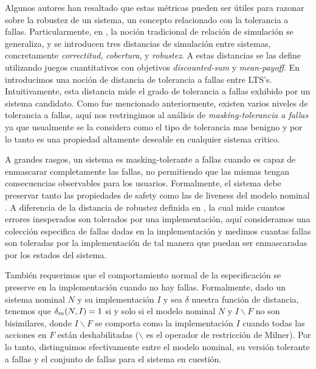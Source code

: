 Algunos autores han resaltado que estas métricas pueden ser útiles para razonar sobre la robustez de un sistema, un concepto relacionado con la tolerancia a fallas. Particularmente, en \cite{CernyHR12}, la noción tradicional de relación de simulación se generaliza, y se introducen tres distancias de simulación entre sistemas, concretamente \emph{correctitud}, \emph{cobertura}, y \emph{robustez}.
A estas distancias se las define utilizando juegos cuantitativos con objetivos \emph{discounted-sum} y \emph{mean-payoff}.
En \cite{CastroDDP18b} introducimos una noción de distancia de tolerancia a fallas entre LTS's. Intuitivamente, esta distancia mide el grado de tolerancia a fallas exhibido por un sistema candidato. Como fue mencionado anteriormente, existen varios niveles de tolerancia a fallas, aquí nos restringimos al análisis de \emph{masking-tolerancia a fallas} ya que usualmente se la considera como el tipo de tolerancia mas benigno y por lo tanto es una propiedad altamente deseable en cualquier sistema critico.

A grandes rasgos, un sistema es masking-tolerante a fallas cuando es capaz de enmascarar completamente las fallas, no permitiendo que las mismas tengan consecuencias observables para los usuarios. Formalmente, el sistema debe preservar tanto las propiedades de safety como las de liveness del modelo nominal \cite{Gartner99}. A diferencia de la distancia de robustez definida en \cite{CernyHR12}, la cual mide cuantos errores inesperados son tolerados por una implementación, aquí consideramos una colección especifica de fallas dadas en la implementación y medimos cuantas fallas son toleradas por la implementación de tal manera que puedan ser enmascaradas por los estados del sistema.

También requerimos que el comportamiento normal de la especificación se preserve en la implementación cuando no hay fallas. %
Formalmente, dado un sistema nominal $N$ y su implementación $I$ y sea $\delta$ nuestra función de distancia, tenemos que $\delta_{m}(N,I)=1$ si y solo si el modelo nominal $N$ y $I\backslash F$ no son bisimilares, donde $I\backslash F$ se comporta como la implementación $I$ cuando todas las acciones en $F$ están deshabilitadas ($\backslash$ es el operador de restricción de  Milner).
Por lo tanto, distinguimos efectivamente entre el modelo nominal, su versión tolerante a fallas  y el conjunto de fallas para el sistema en cuestión.

